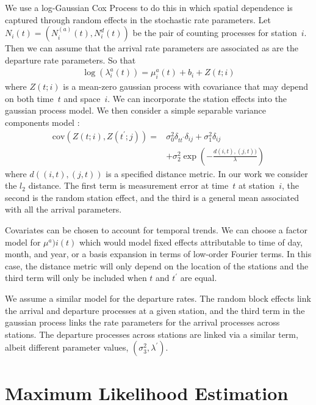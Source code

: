 \documentclass{acm_proc_article-sp}
\begin{document}
We use a log-Gaussian Cox Process to do this in which spatial dependence is captured through random effects in the stochastic rate parameters.  Let $N_i (t) = (N_i^(a) (t), N_i^{d} (t))$ be the pair of counting processes for station~$i$.  Then we can assume that the arrival rate parameters are associated as are the departure rate parameters.  So that
\begin{align}
\log \left( \lambda_i^{a} (t) \right) = \mu^{a}_i(t) + b_i + Z(t;i)
\end{align}
\noindent where $Z(t;i)$ is a mean-zero gaussian process with covariance that may depend on both time~$t$ and space~$i$.  We can incorporate the station effects into the gaussian process model.  We then consider a simple separable variance components model :
\begin{align*}
\text{cov} ( Z(t;i) , Z(t^\prime; j) ) =& \sigma_0^2 \delta_{t t^\prime}  \delta_{i j} + \sigma_1^2  \delta_{i j} \\
&+ \sigma_2^2 \exp \left( -\frac{ d(i,t),(j,t)) }{\lambda} \right)
\end{align*}
\noindent where $d ( (i,t) , (j,t))$ is a specified distance metric. In our work we consider the $l_2$ distance.  The first term is measurement error at time~$t$ at station~$i$, the second is the random station effect, and the third is a general mean associated with all the arrival parameters.

Covariates can be chosen to account for temporal trends.  We can choose a factor model for $\mu^{a})i (t)$ which would model fixed effects attributable to time of day, month, and year, or a basis expansion in terms of low-order Fourier terms.  In this case, the distance metric will only depend on the location of the stations and the third term will only be included when $t$ and $t^\prime$ are equal.

We assume a similar model for the departure rates.  The random block effects link the arrival and departure processes at a given station, and the third term in the gaussian process links the rate parameters for the arrival processes across stations.  The departure processes across stations are linked via a similar term, albeit different parameter values, $(\sigma_3^2, \lambda^\prime)$.

\section{Maximum Likelihood Estimation}
\end{document}
